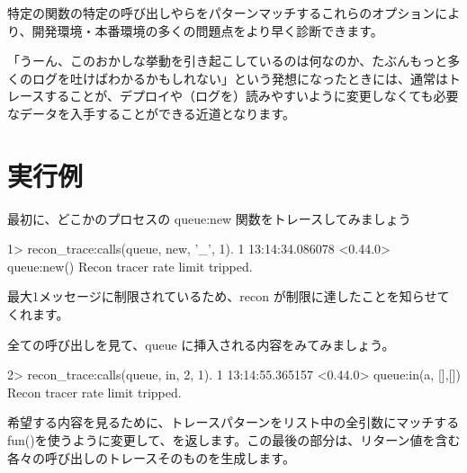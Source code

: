 特定の関数の特定の呼び出しやらをパターンマッチするこれらのオプションにより、開発環境・本番環境の多くの問題点をより早く診断できます。

「うーん、このおかしな挙動を引き起こしているのは何なのか、たぶんもっと多くのログを吐けばわかるかもしれない」という発想になったときには、通常はトレースすることが、デプロイや（ログを）読みやすいように変更しなくても必要なデータを入手することができる近道となります。

\section{実行例}

最初に、どこかのプロセスの queue:new 関数をトレースしてみましょう

\begin{VerbatimEshell}
1> recon_trace:calls({queue, new, '_'}, 1).
1
13:14:34.086078 <0.44.0> queue:new()
Recon tracer rate limit tripped.
\end{VerbatimEshell}

最大1メッセージに制限されているため、recon が制限に達したことを知らせてくれます。

全ての呼び出しを見て、queue に挿入される内容をみてみましょう。

\begin{VerbatimEshell}
2> recon_trace:calls({queue, in, 2}, 1).
1
13:14:55.365157 <0.44.0> queue:in(a, {[],[]})
Recon tracer rate limit tripped.
\end{VerbatimEshell}

希望する内容を見るために、トレースパターンをリスト中の全引数にマッチする fun(\term{\_})を使うように変更して、を返します。この最後の部分は、リターン値を含む各々の呼び出しのトレースそのものを生成します。

